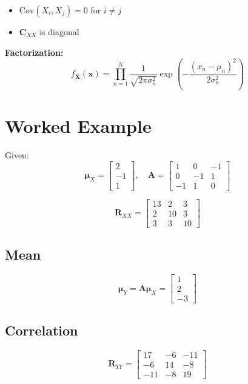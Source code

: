 \documentclass[11pt]{article}
\begin{document}
\begin{itemize}
    \item $\mathrm{Cov}(X_i,X_j)=0$ for $i \neq j$
    \item $\mathbf{C}_{XX}$ is diagonal
\end{itemize}

\textbf{Factorization:}
\begin{equation}
f_{\mathbf{X}}(\mathbf{x}) = \prod_{n=1}^{N}
\frac{1}{\sqrt{2\pi\sigma_n^2}}
\exp\left(-\frac{(x_n - \mu_n)^2}{2\sigma_n^2}\right)
\end{equation}

\section{Worked Example}

Given:
\begin{equation}
\boldsymbol{\mu}_X =
\begin{bmatrix}
2 \\ -1 \\ 1
\end{bmatrix},
\quad
\mathbf{A} =
\begin{bmatrix}
1 & 0 & -1 \\
0 & -1 & 1 \\
-1 & 1 & 0
\end{bmatrix}
\end{equation}

\begin{equation}
\mathbf{R}_{XX} =
\begin{bmatrix}
13 & 2 & 3 \\
2 & 10 & 3 \\
3 & 3 & 10
\end{bmatrix}
\end{equation}

\subsection{Mean}
\begin{equation}
\boldsymbol{\mu}_Y = \mathbf{A}\boldsymbol{\mu}_X =
\begin{bmatrix}
1 \\ 2 \\ -3
\end{bmatrix}
\end{equation}

\subsection{Correlation}
\begin{equation}
\mathbf{R}_{YY} =
\begin{bmatrix}
17 & -6 & -11 \\
-6 & 14 & -8 \\
-11 & -8 & 19
\end{bmatrix}
\end{equation}
\end{document}
